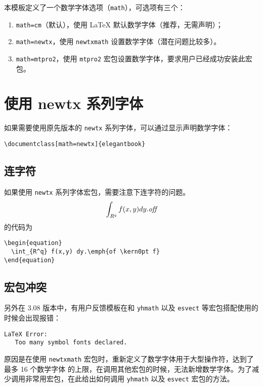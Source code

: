 \documentclass[cn,11pt]{elegantbook}
\begin{document}
本模板定义了一个数学字体选项（\lstinline{math}），可选项有三个：
\begin{enumerate}
  \item \lstinline{math=cm}（默认），使用 \LaTeX{} 默认数学字体（推荐，无需声明）；
  \item \lstinline{math=newtx}，使用 \lstinline{newtxmath} 设置数学字体（潜在问题比较多）。
  \item \lstinline{math=mtpro2}，使用 \lstinline{mtpro2} 宏包设置数学字体，要求用户已经成功安装此宏包。
\end{enumerate}

\section{使用 newtx 系列字体}

如果需要使用原先版本的 \lstinline{newtx} 系列字体，可以通过显示声明数学字体：

\begin{lstlisting}
\documentclass[math=newtx]{elegantbook}
\end{lstlisting}

\subsection{连字符}

如果使用 \lstinline{newtx} 系列字体宏包，需要注意下连字符的问题。
\begin{equation}
  \int_{R^q} f(x,y) dy.\emph{of\kern0pt f}
\end{equation}
的代码为
\begin{lstlisting}
\begin{equation}
  \int_{R^q} f(x,y) dy.\emph{of \kern0pt f}
\end{equation}
\end{lstlisting}

\subsection{宏包冲突}

另外在 3.08 版本中，有用户反馈模板在和 \lstinline{yhmath} 以及 \lstinline{esvect} 等宏包搭配使用的时候会出现报错：
\begin{lstlisting}
LaTeX Error:
   Too many symbol fonts declared.
\end{lstlisting}

原因是在使用 \lstinline{newtxmath} 宏包时，重新定义了数学字体用于大型操作符，达到了 {\heiti 最多 16 个数学字体} 的上限，在调用其他宏包的时候，无法新增数学字体。为了减少调用非常用宏包，在此给出如何调用 \lstinline{yhmath} 以及 \lstinline{esvect} 宏包的方法。
\end{document}
